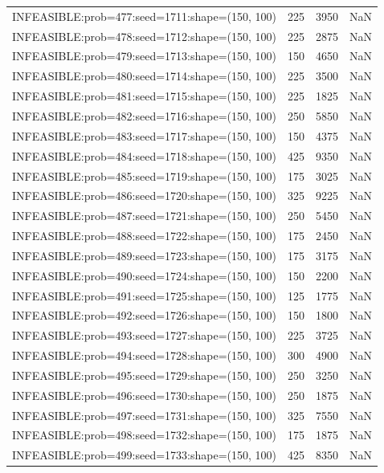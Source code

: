 \begin{longtable}{lccc}
INFEASIBLE:prob=477:seed=1711:shape=(150, 100) &      225 &  3950 &    NaN \\
INFEASIBLE:prob=478:seed=1712:shape=(150, 100) &      225 &  2875 &    NaN \\
INFEASIBLE:prob=479:seed=1713:shape=(150, 100) &      150 &  4650 &    NaN \\
INFEASIBLE:prob=480:seed=1714:shape=(150, 100) &      225 &  3500 &    NaN \\
INFEASIBLE:prob=481:seed=1715:shape=(150, 100) &      225 &  1825 &    NaN \\
INFEASIBLE:prob=482:seed=1716:shape=(150, 100) &      250 &  5850 &    NaN \\
INFEASIBLE:prob=483:seed=1717:shape=(150, 100) &      150 &  4375 &    NaN \\
INFEASIBLE:prob=484:seed=1718:shape=(150, 100) &      425 &  9350 &    NaN \\
INFEASIBLE:prob=485:seed=1719:shape=(150, 100) &      175 &  3025 &    NaN \\
INFEASIBLE:prob=486:seed=1720:shape=(150, 100) &      325 &  9225 &    NaN \\
INFEASIBLE:prob=487:seed=1721:shape=(150, 100) &      250 &  5450 &    NaN \\
INFEASIBLE:prob=488:seed=1722:shape=(150, 100) &      175 &  2450 &    NaN \\
INFEASIBLE:prob=489:seed=1723:shape=(150, 100) &      175 &  3175 &    NaN \\
INFEASIBLE:prob=490:seed=1724:shape=(150, 100) &      150 &  2200 &    NaN \\
INFEASIBLE:prob=491:seed=1725:shape=(150, 100) &      125 &  1775 &    NaN \\
INFEASIBLE:prob=492:seed=1726:shape=(150, 100) &      150 &  1800 &    NaN \\
INFEASIBLE:prob=493:seed=1727:shape=(150, 100) &      225 &  3725 &    NaN \\
INFEASIBLE:prob=494:seed=1728:shape=(150, 100) &      300 &  4900 &    NaN \\
INFEASIBLE:prob=495:seed=1729:shape=(150, 100) &      250 &  3250 &    NaN \\
INFEASIBLE:prob=496:seed=1730:shape=(150, 100) &      250 &  1875 &    NaN \\
INFEASIBLE:prob=497:seed=1731:shape=(150, 100) &      325 &  7550 &    NaN \\
INFEASIBLE:prob=498:seed=1732:shape=(150, 100) &      175 &  1875 &    NaN \\
INFEASIBLE:prob=499:seed=1733:shape=(150, 100) &      425 &  8350 &    NaN \\

\end{longtable}
